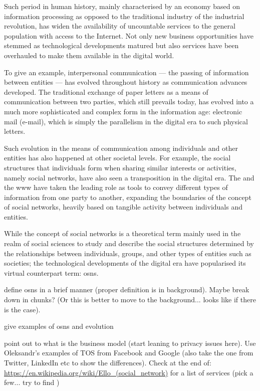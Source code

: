 \documentclass[showtrims]{kthesis}
\begin{document}
Such period in human history, mainly characterised by an economy based on information 
processing as opposed to the traditional industry of the industrial revolution, 
has widen the availability of uncountable services to the general population with 
access to the Internet. Not only new business opportunities have stemmed as technological 
developments matured but also services have been overhauled to make them available 
in the digital world.

To give an example, interpersonal communication --- the passing of information between 
entities --- has evolved throughout history as communication advances developed. 
The traditional exchange of paper letters as a means of communication between two 
parties, which still prevails today, has evolved into a much more sophisticated 
and complex form in the information age: electronic mail (e-mail), which is simply 
the parallelism in the digital era to such physical letters.

Such evolution in the means of communication among individuals and other entities 
has also happened at other societal levels. For example, the social structures that 
individuals form when sharing similar interests or activities, namely social networks, 
have also seen a transposition in the digital era. The \Internet and the \ac{www} 
have taken the leading role as tools to convey different types of information from 
one party to another, expanding the boundaries of the concept of social networks, 
heavily based on tangible activity between individuals and entities.

While the concept of social networks is a theoretical term mainly used in the realm 
of social sciences to study and describe the social structures determined by the 
relationships between individuals, groups, and other types of entities such as societies; 
the technological developments of the digital era have popularised its virtual counterpart 
term: \aclp{osn}.

define osns in a brief manner (proper definition is in background). Maybe break 
down in chunks? (Or this is better to move to the background... looks like if there 
is the case).

give examples of osns and evolution

point out to what is the business model (start leaning to privacy issues here). 
Use Oleksandr's examples of TOS from Facebook and Google (also take the one from 
Twitter, LinkedIn etc to show the differences).
Check at the end of: \url{https://en.wikipedia.org/wiki/Ello_(social_network)} for 
a list of services (pick a few... try to find )
\end{document}
